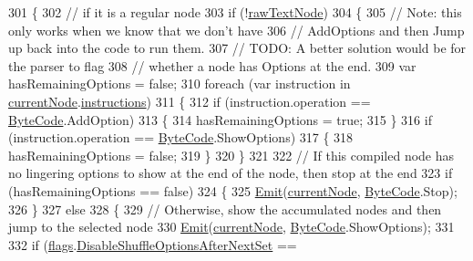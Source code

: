 \begin{DoxyCode}
301         \{
302             \textcolor{comment}{// if it is a regular node}
303             \textcolor{keywordflow}{if} (!\hyperlink{a00053_af6afc8ccb59931650919b863d62d52a4}{rawTextNode})
304             \{
305                 \textcolor{comment}{// Note: this only works when we know that we don't have}
306                 \textcolor{comment}{// AddOptions and then Jump up back into the code to run them.}
307                 \textcolor{comment}{// TODO: A better solution would be for the parser to flag}
308                 \textcolor{comment}{// whether a node has Options at the end.}
309                 var hasRemainingOptions = \textcolor{keyword}{false};
310                 \textcolor{keywordflow}{foreach} (var instruction \textcolor{keywordflow}{in} \hyperlink{a00053_a7384f3d524959a489d51a0a9e1f0477d}{currentNode}.\hyperlink{a00050_a156723a9252b62d288ddf611939ea7c3}{instructions})
311                 \{
312                     \textcolor{keywordflow}{if} (instruction.operation == \hyperlink{a00050_ad5dfb6ee68ca7469623ad3e459f98894}{ByteCode}.AddOption)
313                     \{
314                         hasRemainingOptions = \textcolor{keyword}{true};
315                     \}
316                     \textcolor{keywordflow}{if} (instruction.operation == \hyperlink{a00050_ad5dfb6ee68ca7469623ad3e459f98894}{ByteCode}.ShowOptions)
317                     \{
318                         hasRemainingOptions = \textcolor{keyword}{false};
319                     \}
320                 \}
321 
322                 \textcolor{comment}{// If this compiled node has no lingering options to show at the end of the node, then stop
       at the end}
323                 \textcolor{keywordflow}{if} (hasRemainingOptions == \textcolor{keyword}{false})
324                 \{
325                     \hyperlink{a00053_a774e8c143cdda0584fcfdda98626a83c}{Emit}(\hyperlink{a00053_a7384f3d524959a489d51a0a9e1f0477d}{currentNode}, \hyperlink{a00050_ad5dfb6ee68ca7469623ad3e459f98894}{ByteCode}.Stop);
326                 \}
327                 \textcolor{keywordflow}{else}
328                 \{
329                     \textcolor{comment}{// Otherwise, show the accumulated nodes and then jump to the selected node}
330                     \hyperlink{a00053_a774e8c143cdda0584fcfdda98626a83c}{Emit}(\hyperlink{a00053_a7384f3d524959a489d51a0a9e1f0477d}{currentNode}, \hyperlink{a00050_ad5dfb6ee68ca7469623ad3e459f98894}{ByteCode}.ShowOptions);
331 
332                     \textcolor{keywordflow}{if} (\hyperlink{a00053_a541022d89bcf9bc8f794eb6d6b438d08}{flags}.\hyperlink{a00053_a8b49bb7763ff477cba21d7c771ef3ed0}{DisableShuffleOptionsAfterNextSet} == \textcolor{keyword}{
}
\end{DoxyCode}

